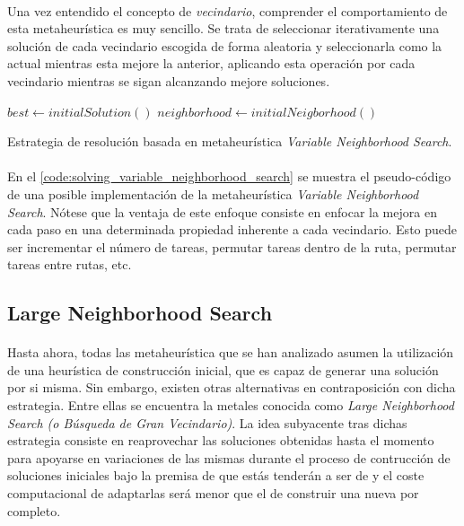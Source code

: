 \documentclass{subfiles}
\begin{document}
        \paragraph{}
        Una vez entendido el concepto de \emph{vecindario}, comprender el comportamiento de esta metaheurística es muy sencillo. Se trata de seleccionar iterativamente una solución de cada vecindario escogida de forma aleatoria y seleccionarla como la actual mientras esta mejore la anterior, aplicando esta operación por cada vecindario mientras se sigan alcanzando mejore soluciones.

        \begin{algorithm}[ht]
          \SetAlgoLined
          $best \gets initialSolution()$\;
          $neighborhood \gets initialNeigborhood()$\;
          \caption{Estrategia de resolución basada en metaheurística \emph{Variable Neighborhood Search}.}
          \label{code:solving_variable_neighborhood_search}
        \end{algorithm}

        \paragraph{}
        En el \cref{code:solving_variable_neighborhood_search} se muestra el pseudo-código de una posible implementación de la metaheurística \emph{Variable Neighborhood Search}. Nótese que la ventaja de este enfoque consiste en enfocar la mejora en cada paso en una determinada propiedad inherente a cada vecindario. Esto puede ser incrementar el número de tareas, permutar tareas dentro de la ruta, permutar tareas entre rutas, etc.

      \subsection{Large Neighborhood Search}
      \label{sec:solving_lns}

        \paragraph{}
        Hasta ahora, todas las metaheurística que se han analizado asumen la utilización de una heurística de construcción inicial, que es capaz de generar una solución por si misma. Sin embargo, existen otras alternativas en contraposición con dicha estrategia. Entre ellas se encuentra la metales conocida como \emph{Large Neighborhood Search (o Búsqueda de Gran Vecindario)}. La idea subyacente tras dichas estrategia consiste en reaprovechar las soluciones obtenidas hasta el momento para apoyarse en variaciones de las mismas durante el proceso de contrucción de soluciones iniciales bajo la premisa de que estás tenderán a ser de  y el coste computacional de adaptarlas será menor que el de construir una nueva por completo.
\end{document}
